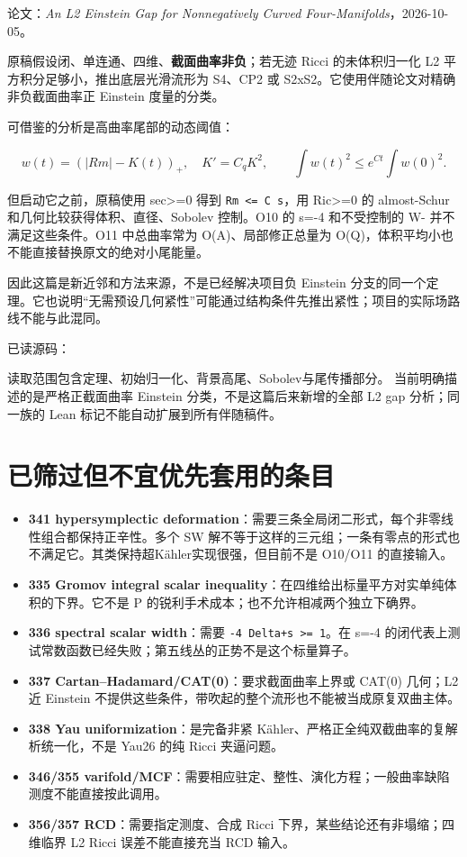\documentclass[UTF8,11pt,openany,oneside,fontset=none]{ctexbook}
\providecommand{\tightlist}{\setlength{\itemsep}{1pt}\setlength{\parskip}{0pt}}
\begin{document}
论文：\emph{An L2 Einstein Gap for Nonnegatively Curved Four-Manifolds}，2026-10-05。\cite{OAI348}

原稿假设闭、单连通、四维、\textbf{截面曲率非负}；若无迹 Ricci 的未体积归一化 L2 平方积分足够小，推出底层光滑流形为 S4、CP2 或 S2xS2。它使用伴随论文对精确非负截面曲率正 Einstein 度量的分类。

可借鉴的分析是高曲率尾部的动态阈值：

\[
w(t)=(|Rm|-K(t))_+,\quad K'=C_qK^2,
\qquad \int w(t)^2\le e^{Ct}\int w(0)^2.
\]

但启动它之前，原稿使用 sec\textgreater=0 得到 \texttt{\textbar{}Rm\textbar{}\ \textless{}=\ C\ s}，用 Ric\textgreater=0 的 almost-Schur 和几何比较获得体积、直径、Sobolev 控制。O10 的 s=-4 和不受控制的 W- 并不满足这些条件。O11 中总曲率常为 O(A)、局部修正总量为 O(Q)，体积平均小也不能直接替换原文的绝对小尾能量。

因此这篇是新近邻和方法来源，不是已经解决项目负 Einstein 分支的同一个定理。它也说明``无需预设几何紧性''可能通过结构条件先推出紧性；项目的实际场路线不能与此混同。

已读源码： 

读取范围包含定理、初始归一化、背景高尾、Sobolev与尾传播部分。 当前明确描述的是严格正截面曲率 Einstein 分类，不是这篇后来新增的全部 L2 gap 分析；同一族的 Lean 标记不能自动扩展到所有伴随稿件。

\section{已筛过但不宜优先套用的条目}\label{ch6:ux5df2ux7b5bux8fc7ux4f46ux4e0dux5b9cux4f18ux5148ux5957ux7528ux7684ux6761ux76ee}

\begin{itemize}
\tightlist
\item
  \textbf{341 hypersymplectic deformation}：需要三条全局闭二形式，每个非零线性组合都保持正辛性。多个 SW 解不等于这样的三元组；一条有零点的形式也不满足它。其类保持超Kähler实现很强，但目前不是 O10/O11 的直接输入。
\item
  \textbf{335 Gromov integral scalar inequality}：在四维给出标量平方对实单纯体积的下界。它不是 P 的锐利手术成本；也不允许相减两个独立下确界。
\item
  \textbf{336 spectral scalar width}：需要 \texttt{-4\ Delta+s\ \textgreater{}=\ 1}。在 s=-4 的闭代表上测试常数函数已经失败；第五线丛的正势不是这个标量算子。
\item
  \textbf{337 Cartan--Hadamard/CAT(0)}：要求截面曲率上界或 CAT(0) 几何；L2 近 Einstein 不提供这些条件，带吹起的整个流形也不能被当成原复双曲主体。
\item
  \textbf{338 Yau uniformization}：是完备非紧 Kähler、严格正全纯双截曲率的复解析统一化，不是 Yau26 的纯 Ricci 夹逼问题。
\item
  \textbf{346/355 varifold/MCF}：需要相应驻定、整性、演化方程；一般曲率缺陷测度不能直接按此调用。
\item
  \textbf{356/357 RCD}：需要指定测度、合成 Ricci 下界，某些结论还有非塌缩；四维临界 L2 Ricci 误差不能直接充当 RCD 输入。
\end{itemize}
\end{document}
